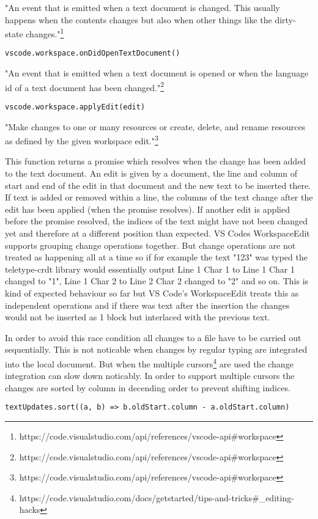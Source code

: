 "An event that is emitted when a text document is changed. This usually happens when the contents changes but also when other things like the dirty-state changes."\footnote{https://code.visualstudio.com/api/references/vscode-api\#workspace}

\begin{lstlisting}
vscode.workspace.onDidOpenTextDocument()
\end{lstlisting}

"An event that is emitted when a text document is opened or when the language id of a text document has been changed."\footnote{https://code.visualstudio.com/api/references/vscode-api\#workspace}

\begin{lstlisting}
vscode.workspace.applyEdit(edit)
\end{lstlisting}
"Make changes to one or many resources or create, delete, and rename resources as defined by the given workspace edit."\footnote{https://code.visualstudio.com/api/references/vscode-api\#workspace}

This function returns a promise which resolves when the change has been added to the text document.
An edit is given by a document, the line and column of start and end of the edit in that document and the new text to be inserted there.
If text is added or removed within a line, the columns of the text change after the edit has been applied (when the promise resolves). If another edit is applied before the promise resolved, the indices of the text might have not been changed yet and therefore at a different position than expected. VS Codes WorkspaceEdit supports grouping change operations together. But change operations are not treated as happening all at a time so if for example the text "123" was typed the teletype-crdt library would essentially output Line 1 Char 1 to Line 1 Char 1 changed to "1", Line 1 Char 2 to Line 2 Char 2 changed to "2" and so on. This is kind of expected behaviour so far but VS Code's WorkspaceEdit treats this as independent operations and if there was text after the insertion the changes would not be inserted as 1 block but interlaced with the previous text. 

In order to avoid this race condition all changes to a file have to be carried out sequentially. This is not noticable when changes by regular typing are integrated into the local document. But when the multiple cursors\footnote{https://code.visualstudio.com/docs/getstarted/tips-and-tricks\#\_editing-hacks} are used the change integration can slow down noticably. In order to support multiple cursors the changes are sorted by column in decending order to prevent shifting indices. 
\begin{lstlisting}
textUpdates.sort((a, b) => b.oldStart.column - a.oldStart.column)
\end{lstlisting}